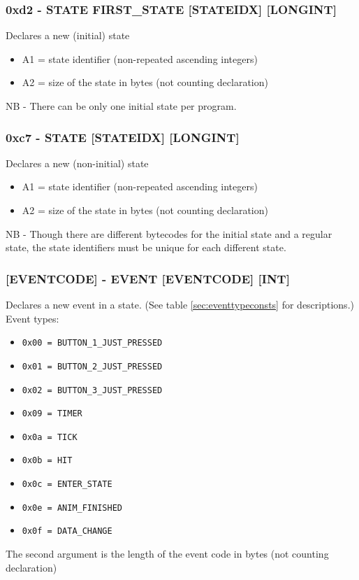 \documentclass[12pt,a4paper]{scrbook}
\begin{document}
\subsubsection{0xd2 - STATE FIRST\_STATE [STATEIDX] [LONGINT]}
Declares a new (initial) state
\begin{itemize}
\item A1 = state identifier (non-repeated ascending integers)
\item A2 = size of the state in bytes (not counting declaration)
\end{itemize}
NB - There can be only one initial state per program.

\subsubsection{0xc7 - STATE [STATEIDX] [LONGINT]}
Declares a new (non-initial) state
\begin{itemize}
\item A1 = state identifier (non-repeated ascending integers)
\item A2 = size of the state in bytes (not counting declaration)
\end{itemize}
NB - Though there are different bytecodes for the initial state and a regular state,
the state identifiers must be unique for each different state.

\subsubsection{[EVENTCODE] - EVENT [EVENTCODE] [INT]}
Declares a new event in a state.  (See table \ref{sec:eventtypeconsts} for descriptions.)
Event types:
\begin{itemize}
\item \texttt{0x00 = BUTTON\_1\_JUST\_PRESSED}
\item \texttt{0x01 = BUTTON\_2\_JUST\_PRESSED}
\item \texttt{0x02 = BUTTON\_3\_JUST\_PRESSED}
\item \texttt{0x09 = TIMER}
\item \texttt{0x0a = TICK}
\item \texttt{0x0b = HIT}
\item \texttt{0x0c = ENTER\_STATE}
\item \texttt{0x0e = ANIM\_FINISHED}
\item \texttt{0x0f = DATA\_CHANGE}
\end{itemize}
The second argument is the length of the event code in bytes (not counting declaration)
\end{document}
